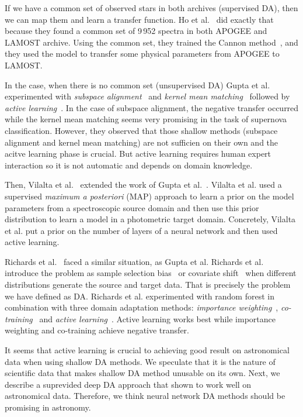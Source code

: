 If we have a common set of observed stars in both archives (supervised DA),
then we can map them and learn a transfer function.
Ho et al.~\cite{ho2017} did exactly that
because they found a common set of 9\,952 spectra in both APOGEE and LAMOST archive.
Using the common set, they trained the Cannon method~\cite{ness2015},
and they used the model to transfer some physical parameters from APOGEE to LAMOST.

In the case, when there is no common set (unsupervised DA)
Gupta et al.~\cite{gupta2016} experimented
with \textit{subspace alignment}~\cite{fernando2014}
and \textit{kernel mean matching}~\cite{gretton2009}
followed by \textit{active learning}~\cite{settles2009}.
In the case of subspace alignment,
the negative transfer occurred
while the kernel mean matching seems very promising in the task of supernova classification.
However, they observed that those shallow methods
(subspace alignment and kernel mean matching) are not sufficien on their own
and the acitve learning phase is crucial.
But active learning requires human expert interaction
so it is not automatic and depends on domain knowledge.

Then, Vilalta et al.~\cite{vilalta2018} extended the work of Gupta et al.~\cite{gupta2016}.
Vilalta et al. used a supervised \textit{maximum a posteriori} (MAP) approach
to learn a prior on the model parameters from a spectroscopic source domain
and then use this prior distribution to learn a model in a photometric target domain.
Concretely, Vilalta et al. put a prior on the number of layers of a neural network
and then used active learning.

Richards et al.~\cite{richards2011} faced a similar situation, as Gupta et al.
Richards et al. introduce the problem as sample selection bias~\cite{shimodaira2000} or covariate shift~\cite{heckman1979}
when different distributions generate the source and target data.
That is precisely the problem we have defined as DA.
Richards et al. experimented with random forest in combination with three domain adaptation methods:
\textit{importance weighting}~\cite{shimodaira2000},
\textit{co-training}~\cite{blum1998}
and \textit{active learning}~\cite{settles2009}.
Active learning works best while importance weighting and co-training achieve negative transfer.

It seems that active learning is crucial
to achieving good result on astronomical data when using shallow DA methods.
We speculate that it is the nature of scientific data
that makes shallow DA method unusable on its own.
Next, we describe a suprevided deep DA  approach
that shown to work well on astronomical data.
Therefore, we think neural network DA methods should be promising in astronomy.

